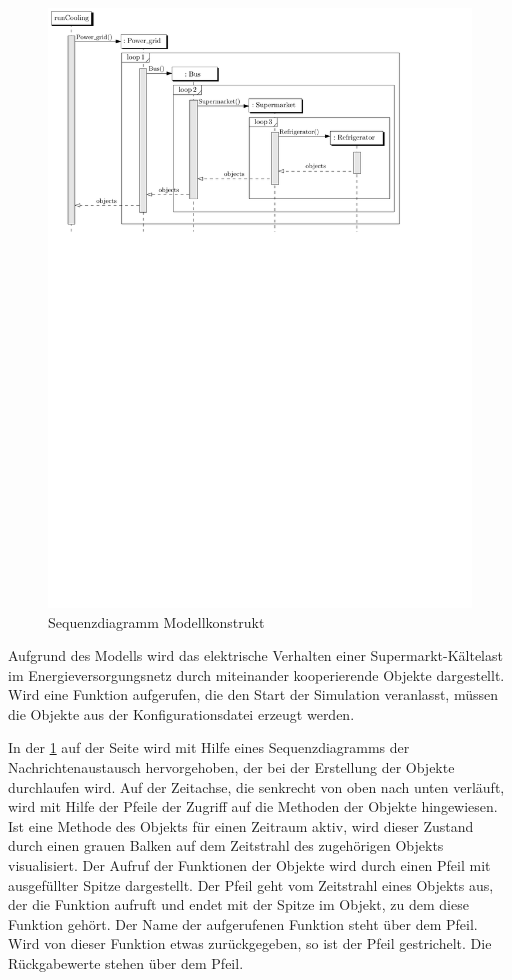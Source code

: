 \begin{figure}[h]
	\begin{center}
		\includegraphics[scale=0.8]{images/Theorie_Super/sequence_one}
	\end{center}
\caption{Sequenzdiagramm Modellkonstrukt}
\label{fig:uml_sequence}
\end{figure}

Aufgrund des Modells wird das elektrische Verhalten einer
Supermarkt-K\"altelast im Energieversorgungsnetz durch miteinander
kooperierende Objekte dargestellt. Wird eine Funktion aufgerufen, die den Start
der Simulation veranlasst, m\"ussen die Objekte aus der Konfigurationsdatei
erzeugt werden.

In der \cref{fig:uml_sequence} auf der Seite \pageref{fig:uml_sequence} wird mit
Hilfe eines Sequenzdiagramms der Nachrichtenaustausch hervorgehoben, der bei
der Erstellung der Objekte durchlaufen wird. Auf der Zeitachse, die senkrecht
von oben nach unten verl\"auft, wird mit Hilfe der Pfeile der Zugriff auf die
Methoden der Objekte hingewiesen. Ist eine Methode des Objekts f\"ur einen
Zeitraum aktiv, wird dieser Zustand durch einen grauen Balken auf dem Zeitstrahl
des zugeh\"origen Objekts visualisiert. Der Aufruf der Funktionen der Objekte
wird durch einen Pfeil mit ausgef\"ullter Spitze dargestellt. Der Pfeil geht vom
Zeitstrahl eines Objekts aus, der die Funktion aufruft und endet mit der Spitze
im Objekt, zu dem diese Funktion geh\"ort. Der Name der aufgerufenen Funktion
steht \"uber dem Pfeil. Wird von dieser Funktion etwas zur\"uckgegeben, so ist
der Pfeil gestrichelt. Die R\"uckgabewerte stehen \"uber dem Pfeil.

